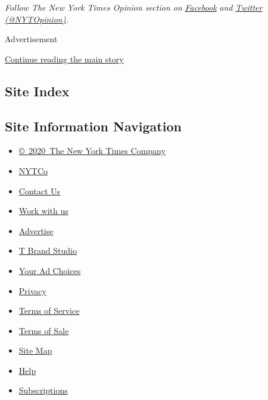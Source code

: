 \emph{Follow The New York Times Opinion section on}
\href{https://www.facebook.com/nytopinion}{\emph{Facebook}} \emph{and}
\href{http://twitter.com/NYTOpinion}{\emph{Twitter
(@NYTOpinion)}}\emph{.}

Advertisement

\protect\hyperlink{after-bottom}{Continue reading the main story}

\hypertarget{site-index}{%
\subsection{Site Index}\label{site-index}}

\hypertarget{site-information-navigation}{%
\subsection{Site Information
Navigation}\label{site-information-navigation}}

\begin{itemize}
\tightlist
\item
  \href{https://help.nytimes.com/hc/en-us/articles/115014792127-Copyright-notice}{©~2020~The
  New York Times Company}
\end{itemize}

\begin{itemize}
\tightlist
\item
  \href{https://www.nytco.com/}{NYTCo}
\item
  \href{https://help.nytimes.com/hc/en-us/articles/115015385887-Contact-Us}{Contact
  Us}
\item
  \href{https://www.nytco.com/careers/}{Work with us}
\item
  \href{https://nytmediakit.com/}{Advertise}
\item
  \href{http://www.tbrandstudio.com/}{T Brand Studio}
\item
  \href{https://www.nytimes.com/privacy/cookie-policy\#how-do-i-manage-trackers}{Your
  Ad Choices}
\item
  \href{https://www.nytimes.com/privacy}{Privacy}
\item
  \href{https://help.nytimes.com/hc/en-us/articles/115014893428-Terms-of-service}{Terms
  of Service}
\item
  \href{https://help.nytimes.com/hc/en-us/articles/115014893968-Terms-of-sale}{Terms
  of Sale}
\item
  \href{https://spiderbites.nytimes.com}{Site Map}
\item
  \href{https://help.nytimes.com/hc/en-us}{Help}
\item
  \href{https://www.nytimes.com/subscription?campaignId=37WXW}{Subscriptions}
\end{itemize}

